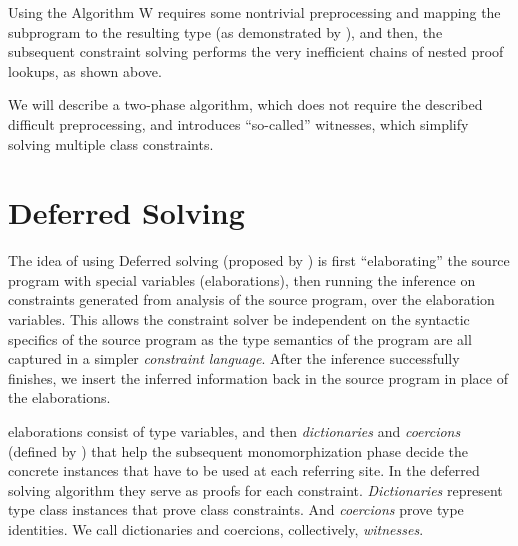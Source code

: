 \begin{observe}
\end{observe}

Using the Algorithm W requires some nontrivial preprocessing and mapping the subprogram to the resulting type (as demonstrated by \citet{jones1999typing}), and then, the subsequent constraint solving performs the very inefficient chains of nested proof lookups, as shown above.

We will describe a two-phase algorithm, which does not require the described difficult preprocessing, and introduces ``so-called'' witnesses, which simplify solving multiple class constraints.

\section{Deferred Solving}
\label{defer_solve}

The idea of using Deferred solving (proposed by \cite{vytiniotis2011outsidein}) is first ``elaborating'' the source program with special variables (elaborations), then running the inference on constraints generated from analysis of the source program, over the elaboration variables. This allows the constraint solver be independent on the syntactic specifics of the source program as the type semantics of the program are all captured in a simpler \emph{constraint language}. After the inference successfully finishes,  we insert the inferred information back in the source program in place of the elaborations.

elaborations consist of type variables, and then \emph{dictionaries} and \emph{coercions} (defined by \cite{vytiniotis2011outsidein}) that help the subsequent monomorphization phase decide the concrete instances that have to be used at each referring site. In the deferred solving algorithm they serve as proofs for each constraint. \emph{Dictionaries} represent type class instances that prove class constraints. And \emph{coercions} prove type identities. We call dictionaries and coercions, collectively, \emph{witnesses}.

